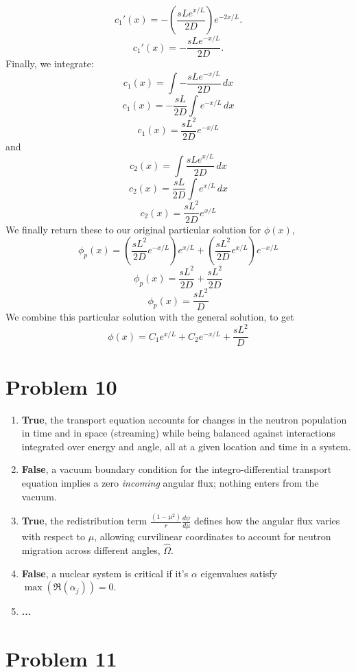 \documentclass{article}
\newcommand{\Oh}{\hat{\Omega}}
\begin{document}
$$ c_1'(x) = -\left(\frac{sLe^{x/L}}{2D}\right)e^{-2x/L} .$$
$$ c_1'(x) = -\frac{sLe^{-x/L}}{2D} .$$
Finally, we integrate:
$$ c_1(x) = \int -\frac{sLe^{-x/L}}{2D}\, dx $$
$$ c_1(x) = -\frac{sL}{2D}\int e^{-x/L}\, dx $$
$$ c_1(x) = \frac{sL^2}{2D}e^{-x/L}$$
and
$$ c_2(x) = \int \frac{sLe^{x/L}}{2D}\, dx $$
$$ c_2(x) = \frac{sL}{2D}\int e^{x/L}\, dx $$
$$ c_2(x) = \frac{sL^2}{2D}e^{x/L}$$
We finally return these to our original particular solution for $\phi(x)$,
$$ \phi_p(x) = \left(\frac{sL^2}{2D}e^{-x/L}\right)e^{x/L} + \left(\frac{sL^2}{2D}e^{x/L}\right)e^{-x/L} $$
$$ \phi_p(x) = \frac{sL^2}{2D} + \frac{sL^2}{2D} $$
$$ \phi_p(x) = \frac{sL^2}{D} $$
We combine this particular solution with the general solution, to get
$$\boxed{ \phi(x) = C_1e^{x/L} + C_2e^{-x/L} + \frac{sL^2}{D} }$$




\section*{Problem 10}

\begin{enumerate}
\item \textbf{True}, the transport equation accounts for changes in the neutron population in time and in space (streaming) while being balanced against interactions integrated over energy and angle, all at a given location and time in a system.
\item \textbf{False}, a vacuum boundary condition for the integro-differential transport equation implies a zero \textit{incoming} angular flux; nothing enters from the vacuum.
\item \textbf{True}, the redistribution term $\frac{(1-\mu^2)}{r}\frac{d\psi}{d\mu}$ defines how the angular flux varies with respect to $\mu$, allowing curvilinear coordinates to account for neutron migration across different angles, $\Oh$.
\item \textbf{False}, a nuclear system is critical if it’s $\alpha$ eigenvalues satisfy $\max(\Re(\alpha_j)) = 0$.
\item \textbf{...}
\end{enumerate}




\section*{Problem 11}
\end{document}
